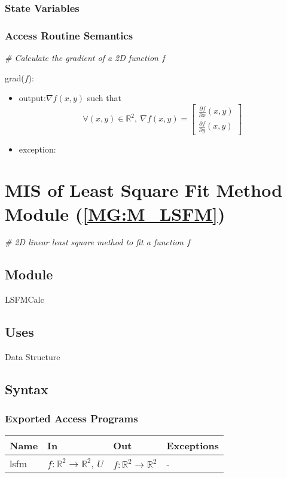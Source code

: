 \documentclass[12pt, titlepage]{article}
\begin{document}
\subsubsection{State Variables}


\subsubsection{Access Routine Semantics}

\noindent\textit{{\#} Calculate the gradient of a 2D function $f$} \medskip

\noindent grad($f$):
\begin{itemize} 
\item output:$ \nabla f(x,y)$ such that
\begin{equation*}
\forall (x,y) \in \mathbb{R}^2, \ \nabla f(x,y) = \begin{bmatrix}
\frac{\partial f}{\partial x}(x,y) \\
\frac{\partial f}{\partial y}(x,y)
\end{bmatrix}
\end{equation*}
\item exception:  
\end{itemize}

\section{MIS of Least Square Fit Method Module (\texorpdfstring{\cref{MG:M_LSFM}}))} \label{MIS_LSFM}

\textit{{\#} 2D linear least square method to fit a function $f$} \medskip

\subsection{Module}
LSFMCalc
\subsection{Uses}
Data Structure
\subsection{Syntax}

\subsubsection{Exported Access Programs}

\begin{center}
\begin{tabular}{p{2cm} p{4cm} p{4cm} p{2cm}}
\hline
\textbf{Name} & \textbf{In} & \textbf{Out} & \textbf{Exceptions} \\
\hline
lsfm & $f:\mathbb{R}^2\rightarrow\mathbb{R}^2$, $U$ & $f:\mathbb{R}^2\rightarrow\mathbb{R}^2$ & - \\
\hline
\end{tabular}
\end{center}
\end{document}
